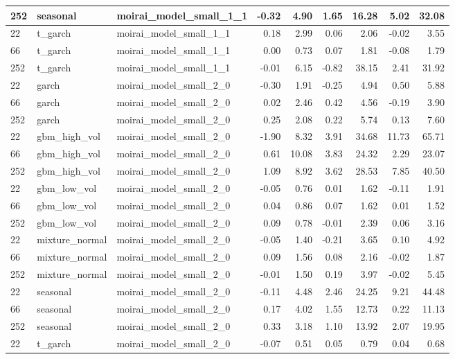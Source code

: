 {\begin{tabular}{lllrrrrrr}
252 & seasonal & moirai\_model\_small\_1\_1 & -0.32 & 4.90 & 1.65 & 16.28 & 5.02 & 32.08 \\
\midrule
22 & t\_garch & moirai\_model\_small\_1\_1 & 0.18 & 2.99 & 0.06 & 2.06 & -0.02 & 3.55 \\
66 & t\_garch & moirai\_model\_small\_1\_1 & 0.00 & 0.73 & 0.07 & 1.81 & -0.08 & 1.79 \\
252 & t\_garch & moirai\_model\_small\_1\_1 & -0.01 & 6.15 & -0.82 & 38.15 & 2.41 & 31.92 \\
\midrule
22 & garch & moirai\_model\_small\_2\_0 & -0.30 & 1.91 & -0.25 & 4.94 & 0.50 & 5.88 \\
66 & garch & moirai\_model\_small\_2\_0 & 0.02 & 2.46 & 0.42 & 4.56 & -0.19 & 3.90 \\
252 & garch & moirai\_model\_small\_2\_0 & 0.25 & 2.08 & 0.22 & 5.74 & 0.13 & 7.60 \\
\midrule
22 & gbm\_high\_vol & moirai\_model\_small\_2\_0 & -1.90 & 8.32 & 3.91 & 34.68 & 11.73 & 65.71 \\
66 & gbm\_high\_vol & moirai\_model\_small\_2\_0 & 0.61 & 10.08 & 3.83 & 24.32 & 2.29 & 23.07 \\
252 & gbm\_high\_vol & moirai\_model\_small\_2\_0 & 1.09 & 8.92 & 3.62 & 28.53 & 7.85 & 40.50 \\
\midrule
22 & gbm\_low\_vol & moirai\_model\_small\_2\_0 & -0.05 & 0.76 & 0.01 & 1.62 & -0.11 & 1.91 \\
66 & gbm\_low\_vol & moirai\_model\_small\_2\_0 & 0.04 & 0.86 & 0.07 & 1.62 & 0.01 & 1.52 \\
252 & gbm\_low\_vol & moirai\_model\_small\_2\_0 & 0.09 & 0.78 & -0.01 & 2.39 & 0.06 & 3.16 \\
\midrule
22 & mixture\_normal & moirai\_model\_small\_2\_0 & -0.05 & 1.40 & -0.21 & 3.65 & 0.10 & 4.92 \\
66 & mixture\_normal & moirai\_model\_small\_2\_0 & 0.09 & 1.56 & 0.08 & 2.16 & -0.02 & 1.87 \\
252 & mixture\_normal & moirai\_model\_small\_2\_0 & -0.01 & 1.50 & 0.19 & 3.97 & -0.02 & 5.45 \\
\midrule
22 & seasonal & moirai\_model\_small\_2\_0 & -0.11 & 4.48 & 2.46 & 24.25 & 9.21 & 44.48 \\
66 & seasonal & moirai\_model\_small\_2\_0 & 0.17 & 4.02 & 1.55 & 12.73 & 0.22 & 11.13 \\
252 & seasonal & moirai\_model\_small\_2\_0 & 0.33 & 3.18 & 1.10 & 13.92 & 2.07 & 19.95 \\
\midrule
22 & t\_garch & moirai\_model\_small\_2\_0 & -0.07 & 0.51 & 0.05 & 0.79 & 0.04 & 0.68 \\

\end{tabular}}

